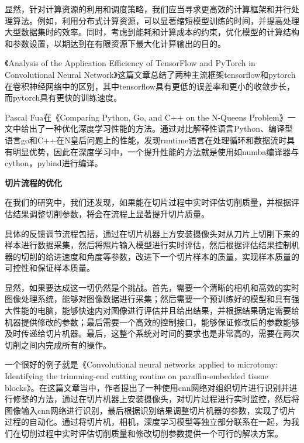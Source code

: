显然，针对计算资源的利用和调度策略，我们应当寻求更高效的计算框架和并行处理算法。例如，利用分布式计算资源，可以显著缩短模型训练的时间，并提高处理大型数据集时的效率。同时，考虑到能耗和计算成本的约束，优化模型的计算结构和参数设置，以期达到在有限资源下最大化计算输出的目的。

《Analysis of the Application Efficiency of TensorFlow and PyTorch in Convolutional Neural Network》这篇文章总结了两种主流框架tensorflow和pytorch在卷积神经网络中的区别，其中tensorflow具有更低的误差率和更小的收敛步长，而pytorch具有更快的训练速度\cite{6.2}。




Pascal Fua在《Comparing Python, Go, and C++ on the N-Queens Problem》一文中给出了一种优化深度学习性能的方法。通过对比解释性语言Python、编译型语言go和C++在N皇后问题上的性能，发现runtime语言在处理循环和数据流时具有明显优势，因此在深度学习中，一个提升性能的方法就是使用如numba编译器与cython，pybind进行编译\cite{6.3}。



\textbf{切片流程的优化}

在我们的研究中，我们还发现，如果能在切片过程中实时评估切削质量，并根据评估结果调整切削参数，将会在流程上显著提升切片质量。

具体的反馈调节流程包括，通过在切片机器上方安装摄像头对从刀片上切削下来的样本进行数据采集，然后将照片输入模型进行实时评估，然后根据评估结果控制机器的切削的给进速度和角度等参数，改进下一个切片样本的质量，实现样本质量的可控性和保证样本质量。

显然，如果要达成这一切仍然是个挑战。首先，需要一个清晰的相机和高效的实时图像处理系统，能够对图像数据进行采集；然后需要一个预训练好的模型和具有强大性能的电脑，能够快速内对图像进行评估并且给出结果，并根据结果确定需要给机器提供修改的参数；最后需要一个高效的控制接口，能够保证修改后的参数能够及时传递给切片机器。最后，这整个系统对时间的要求也是非常高的，需要在两次切削之间内完成所有的操作。

一个很好的例子就是《Convolutional neural networks applied to microtomy: Identifying the trimming-end cutting routine on paraffin-embedded tissue blocks》。在这篇文章当中，作者提出了一种使用cnn网络对组织切片进行识别并进行修整的方法，通过在切片机器上安装摄像头，对切片过程进行实时监控，然后将图像输入cnn网络进行识别，最后根据识别结果调整切片机器的参数，实现了切片过程的自动化\cite{6.4}。通过将切片机，相机，深度学习模型等独立部分联系在一起，为我们在切削过程中实时评估切削质量和修改切削参数提供一个可行的解决方案。


